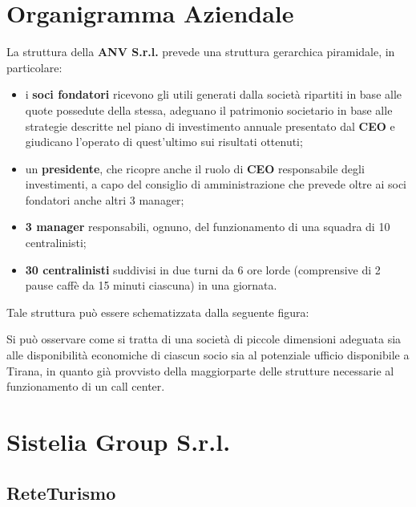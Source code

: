 \section[Organigramma Aziendale]{Organigramma Aziendale}
La struttura della\textbf{ \ac{ANV S.r.l.}} prevede una struttura gerarchica piramidale, in particolare:
\begin{itemize}

 	\item i \textbf{soci fondatori} ricevono gli utili generati dalla società ripartiti in base alle quote possedute della stessa, adeguano il patrimonio societario in base alle strategie descritte nel piano di investimento annuale presentato dal \textbf{\ac{CEO}} e giudicano l'operato di quest'ultimo sui risultati ottenuti; 
 	
	\item un \textbf{presidente}, che ricopre anche il ruolo di \textbf{\ac{CEO}} responsabile degli investimenti, a capo del consiglio di amministrazione che prevede oltre ai soci fondatori anche altri 3 manager;
	
	\item \textbf{3 manager} responsabili, ognuno, del funzionamento di una squadra di 10 centralinisti;
	
	\item \textbf{30 centralinisti} suddivisi in due turni da 6 ore lorde (comprensive di 2 pause caffè da 15 minuti ciascuna) in una giornata. 

\end{itemize}  

Tale struttura può essere schematizzata dalla seguente figura:
\newline


Si può osservare come si tratta di una società di piccole dimensioni adeguata sia alle disponibilità economiche di ciascun socio sia al potenziale ufficio disponibile a Tirana, in quanto già provvisto della maggiorparte delle strutture necessarie al funzionamento di un call center.

\section[Sistelia Group S.r.l.]{Sistelia Group S.r.l.}

\subsection[ReteTurismo]{ReteTurismo}